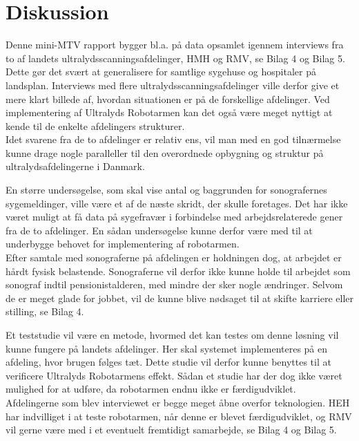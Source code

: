 \chapter{Diskussion}
Denne mini-MTV rapport bygger bl.a. på data opsamlet igennem interviews fra to af landets ultralydsscanningsafdelinger, HMH og RMV, se Bilag 4 og Bilag 5. Dette gør det svært at generalisere for samtlige sygehuse og hospitaler på landsplan. Interviews med flere ultralydsscanningsafdelinger ville derfor give et mere klart billede af, hvordan situationen er på de forskellige afdelinger. Ved implementering af Ultralyds Robotarmen kan det også være meget nyttigt at kende til de enkelte afdelingers strukturer. \\
Idet svarene fra de to afdelinger er relativ ens, vil man med en god tilnærmelse kunne drage nogle paralleller til den overordnede opbygning og struktur på ultralydsafdelingerne i Danmark.

En større undersøgelse, som skal vise antal og baggrunden for sonografernes sygemeldinger, ville være et af de næste skridt, der skulle foretages. Det har ikke været muligt at få data på sygefravær i forbindelse med arbejdsrelaterede gener fra de to afdelinger. En sådan undersøgelse kunne derfor være med til at underbygge behovet for implementering af robotarmen. \\
Efter samtale med sonograferne på afdelingen er holdningen dog, at arbejdet er hårdt fysisk belastende.  Sonograferne vil derfor ikke kunne holde til arbejdet som sonograf indtil pensionistalderen, med mindre der sker nogle ændringer. Selvom de er meget glade for jobbet, vil de kunne blive nødsaget til at skifte karriere eller stilling, se Bilag 4. 


Et teststudie vil være en metode, hvormed det kan testes om denne løsning vil kunne fungere på landets afdelinger. Her skal systemet implementeres på en afdeling, hvor brugen følges tæt. Dette studie vil derfor kunne benyttes til at verificere Ultralyds Robotarmens effekt. Sådan et studie har der dog ikke været mulighed for at udføre, da robotarmen endnu ikke er færdigudviklet. \\
Afdelingerne som blev interviewet er begge meget åbne overfor teknologien. HEH har indvilliget i at teste robotarmen, når denne er blevet færdigudviklet, og RMV vil gerne være med i et eventuelt fremtidigt samarbejde, se Bilag 4 og Bilag 5. 

